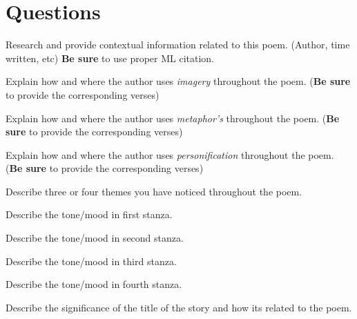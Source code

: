 \documentclass[12pt]{article} %
\begin{document}
\section*{Questions}
\begin{qstn}
  Research and provide contextual information related to this poem. (Author, time written, etc) \textbf{Be sure} to use
  proper ML citation.
\end{qstn}
\begin{qstn}
  Explain how and where the author uses \textit{imagery} throughout the poem. (\textbf{Be sure} to provide the corresponding verses)
\end{qstn}
\begin{qstn}
  Explain how and where the author uses \textit{metaphor's} throughout the poem. (\textbf{Be sure} to provide the corresponding verses)
\end{qstn}
\begin{qstn}
  Explain how and where the author uses \textit{personification} throughout the poem. (\textbf{Be sure} to provide the corresponding verses)
\end{qstn}
\begin{qstn}
  Describe three or four themes you have noticed throughout the poem.
\end{qstn}
\begin{qstn}
  Describe the tone/mood in first stanza.
\end{qstn}
\begin{qstn}
  Describe the tone/mood in second stanza.
\end{qstn}
\begin{qstn}
  Describe the tone/mood in third stanza.
\end{qstn}
\begin{qstn}
  Describe the tone/mood in fourth stanza.
\end{qstn}
\begin{qstn}
  Describe the significance of the title of the story and how its related to the poem.
\end{qstn}
\end{document}
